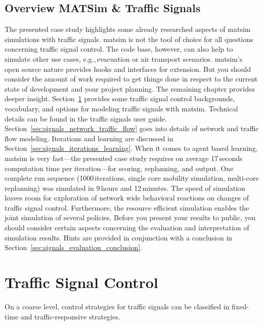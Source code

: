 \subsection{Overview MATSim \& Traffic Signals}
The presented case study highlights some already researched aspects of \gls{matsim} simulations with traffic signals. 
\gls{matsim} is not the tool of choice for all questions concerning traffic signal control. 
The code base, however, can also help to simulate other use cases, e.g.,\,evacuation or air transport scenarios. 
\gls{matsim}'s open source nature provides hooks and interfaces for extension. 
But you should consider the amount of work required to get things done in respect to the current state of development and your project planning. 
The remaining chapter provides deeper insight.  
Section~\ref{sec:signals_traffic_signal_control} provides some traffic signal control backgrounds, vocabulary, and options for modeling traffic signals with \gls{matsim}. 
Technical details can be found in the traffic signals user guide.  
Section~\ref{sec:signals_network_traffic_flow} goes into details of network and traffic flow modeling. 
Iterations and learning are discussed in Section~\ref{sec:signals_iterations_learning}. 
When it comes to agent based learning, \gls{matsim} is very fast---the presented case study requires on average 17\,seconds computation time per iteration---for scoring, replanning, and output. One complete run sequence (1000\,iterations, single core mobility simulation, multi-core replanning) was simulated in 9\,hours and 12\,minutes. 
The speed of simulation leaves room for exploration of network wide behavioral reactions on changes of traffic signal control. 
Furthermore, the resource efficient simulation enables the joint simulation of several policies. 
Before you present your results to public, you should consider certain aspects concerning the  evaluation and interpretation of simulation results. 
Hints are provided in conjunction with a conclusion in Section~\ref{sec:signals_evaluation_conclusion}. 

\section{Traffic Signal Control}
\label{sec:signals_traffic_signal_control}
On a coarse level, control strategies for traffic signals can be classified in fixed-time and traffic-responsive strategies. 


